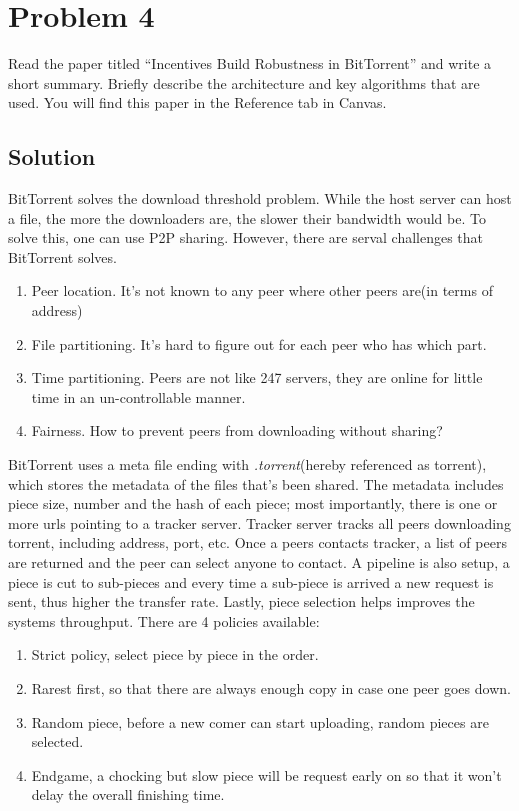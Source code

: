 
\section*{Problem 4}

Read the paper titled ``Incentives Build Robustness in BitTorrent'' and write a short summary.
Briefly describe the architecture and key algorithms that are used.
You will find this paper in the Reference tab in Canvas.

\subsection*{Solution}

BitTorrent solves the download threshold problem.
While the host server can host a file, the more the downloaders are, the slower their bandwidth would be.
To solve this, one can use P2P sharing.
However, there are serval challenges that BitTorrent solves.

\begin{enumerate}
    \item Peer location. It's not known to any peer where other peers are(in terms of address)
    \item File partitioning. It's hard to figure out for each peer who has which part.
    \item Time partitioning. Peers are not like 247 servers, they are online for little time in an un-controllable manner.
    \item Fairness. How to prevent peers from downloading without sharing?
\end{enumerate}

BitTorrent uses a meta file ending with \textit{.torrent}(hereby referenced as torrent), which stores the metadata of the files that's been shared.
The metadata includes piece size, number and the hash of each piece; most importantly, there is one or more urls pointing to a tracker server.
Tracker server tracks all peers downloading torrent, including address, port, etc.
Once a peers contacts tracker, a list of peers are returned and the peer can select anyone to contact.
A pipeline is also setup, a piece is cut to sub-pieces and every time a sub-piece is  arrived a new request is sent, thus higher the transfer rate.
Lastly, piece selection helps improves the systems throughput.
There are 4 policies available:

\begin{enumerate}
    \item Strict policy, select piece by piece in the order.
    \item Rarest first, so that there are always enough copy in case one peer goes down.
    \item Random piece, before a new comer can start uploading, random pieces are selected.
    \item Endgame, a chocking but slow piece will be request early on so that it won't delay the overall finishing time.
\end{enumerate}

